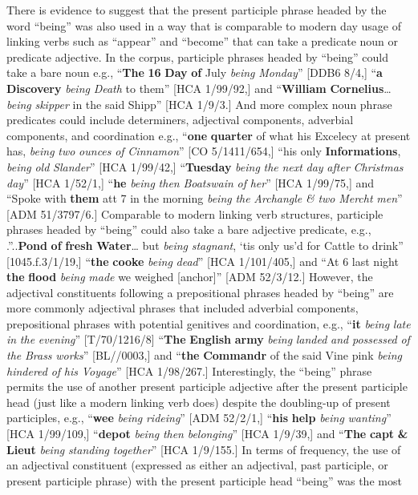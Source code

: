   There is evidence to suggest that the present participle phrase headed by the word “being” was also used in a way that is comparable to modern day usage of linking verbs such as “appear” and “become” that can take a predicate noun or predicate adjective. In the corpus, participle phrases headed by “being” could take a bare noun e.g., “\textbf{The} \textbf{16} \textbf{Day} \textbf{of} July \textit{being} \textit{Monday}” [DDB6 8/4,] “\textbf{a} \textbf{Discovery} \textit{being} \textit{Death} to them” [HCA 1/99/92,] and “\textbf{William} \textbf{Cornelius}…\textit{being} \textit{skipper} in the said Shipp” [HCA 1/9/3.] And more complex noun phrase predicates could include determiners, adjectival components, adverbial components, and coordination e.g., “\textbf{one} \textbf{quarter} of what his Excelecy at present has, \textit{being} \textit{two} \textit{ounces} \textit{of} \textit{Cinnamon}” [CO 5/1411/654,] “his only \textbf{Informations}, \textit{being} \textit{old} \textit{Slander}” [HCA 1/99/42,] “\textbf{Tuesday} \textit{being} \textit{the} \textit{next} \textit{day} \textit{after} \textit{Christmas} \textit{day}” [HCA 1/52/1,] “\textbf{he} \textit{being} \textit{then} \textit{Boatswain} \textit{of} \textit{her}” [HCA 1/99/75,] and “Spoke with \textbf{them} att 7 in the morning \textit{being} \textit{the} \textit{Archangle} \textit{\&} \textit{two} \textit{Mercht} \textit{men}” [ADM 51/3797/6.] Comparable to modern linking verb structures, participle phrases headed by “being” could also take a bare adjective predicate, e.g., .”..\textbf{Pond} \textbf{of} \textbf{fresh} \textbf{Water}… but \textit{being} \textit{stagnant}, ‘tis only us’d for Cattle to drink” [1045.f.3/1/19,] “\textbf{the} \textbf{cooke} \textit{being} \textit{dead}” [HCA 1/101/405,] and “At 6 last night \textbf{the} \textbf{flood} \textit{being} \textit{made} we weighed [anchor]” [ADM 52/3/12.] However, the adjectival constituents following a prepositional phrases headed by “being” are more commonly adjectival phrases that included adverbial components, prepositional phrases with potential genitives and coordination, e.g., “\textbf{it} \textit{being} \textit{late} \textit{in} \textit{the} \textit{evening}” [T/70/1216/8] “\textbf{The} \textbf{English} \textbf{army} \textit{being} \textit{landed} \textit{and} \textit{possessed} \textit{of} \textit{the} \textit{Brass} \textit{works}” [BL/\citealt{Egerton2395}/0003,] and “\textbf{the} \textbf{Commandr} of the said Vine pink \textit{being} \textit{hindered} \textit{of} \textit{his} \textit{Voyage}” [HCA 1/98/267.] Interestingly, the “being” phrase permits the use of another present participle adjective after the present participle head (just like a modern linking verb does) despite the doubling-up of present participles, e.g., “\textbf{wee} \textit{being} \textit{rideing}” [ADM 52/2/1,] “\textbf{his} \textbf{help} \textit{being} \textit{wanting}” [HCA 1/99/109,] “\textbf{depot} \textit{being} \textit{then} \textit{belonging}” [HCA 1/9/39,] and “\textbf{The} \textbf{capt} \textbf{\&} \textbf{Lieut} \textit{being} \textit{standing} \textit{together}” [HCA 1/9/155.] In terms of frequency, the use of an adjectival constituent (expressed as either an adjectival, past participle, or present participle phrase) with the present participle head “being” was the most 